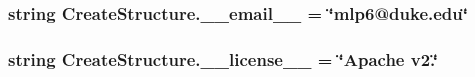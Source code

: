 \subsubsection[{\+\_\+\+\_\+email\+\_\+\+\_\+}]{\setlength{\rightskip}{0pt plus 5cm}string Create\+Structure.\+\_\+\+\_\+email\+\_\+\+\_\+ = \char`\"{}mlp6@duke.\+edu\char`\"{}}\label{namespaceCreateStructure_a47fde5fe18b96e7c414f7ce0ed9becab}
\hypertarget{namespaceCreateStructure_a11f329784c7441166b757bac532d3fef}{}
\subsubsection[{\+\_\+\+\_\+license\+\_\+\+\_\+}]{\setlength{\rightskip}{0pt plus 5cm}string Create\+Structure.\+\_\+\+\_\+license\+\_\+\+\_\+ = \char`\"{}Apache v2.\char`\"{}}\label{namespaceCreateStructure_a11f329784c7441166b757bac532d3fef}
